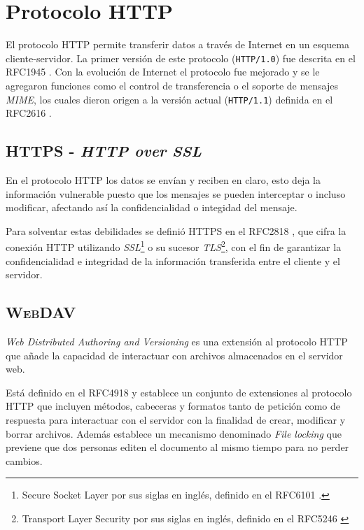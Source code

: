 
\section {Protocolo \textsc{HTTP}}

El protocolo \textsc{\gls{HTTP}} permite transferir datos a trav\'{e}s de Internet en un esquema cliente-servidor. La primer versi\'{o}n de este protocolo (\texttt{HTTP/1.0}) fue descrita en el \textsc{\gls{RFC}}1945 \cite{_rfc_????-1}. Con la evoluci\'{o}n de Internet el protocolo fue mejorado y se le agregaron funciones como el control de transferencia o el soporte de mensajes \textit{MIME}, los cuales dieron origen a la versi\'{o}n actual (\texttt{HTTP/1.1}) definida en el \textsc{\gls{RFC}}2616 \cite{_rfc_????}.

  \subsection {\textsc{HTTPS} - \textit{HTTP over SSL}}

En el protocolo \textsc{\gls{HTTP}} los datos se env\'{i}an y reciben en claro, esto deja la informaci\'{o}n vulnerable puesto que los mensajes se pueden interceptar o incluso modificar, afectando as\'{i} la confidencialidad o integidad del mensaje.

Para solventar estas debilidades se defini\'{o} \textsc{\gls{HTTPS}} en el \textsc{\gls{RFC}}2818 \cite{_rfc_????-6}, que cifra la conexi\'{o}n \textsc{\gls{HTTP}} utilizando \emph{\gls{SSL}}\footnote{Secure Socket Layer por sus siglas en ingl\'{e}s, definido en el \textsc{\gls{RFC}}6101 \cite{_rfc_????-4}.} o su sucesor \emph{\gls{TLS}}\footnote{Transport Layer Security por sus siglas en ingl\'{e}s, definido en el \textsc{\gls{RFC}}5246 \cite{_rfc_????-3}}, con el fin de garantizar la confidencialidad e integridad de la informaci\'{o}n transferida entre el cliente y el servidor.

  \subsection {\textsc{WebDAV}}

\textit{Web Distributed Authoring and Versioning} es una extensi\'{o}n al protocolo \textsc{\gls{HTTP}} que a\~{n}ade la capacidad de interactuar con archivos almacenados en el servidor web.

Est\'{a} definido en el \textsc{\gls{RFC}}4918 \cite{_rfc_????-2} y establece un conjunto de extensiones al protocolo \textsc{\gls{HTTP}} que incluyen m\'{e}todos, cabeceras y formatos tanto de petici\'{o}n como de respuesta para interactuar con el servidor con la finalidad de crear, modificar y borrar archivos. Adem\'{a}s establece un mecanismo denominado \textit{File locking} que previene que dos personas editen el documento al mismo tiempo para no perder cambios.

